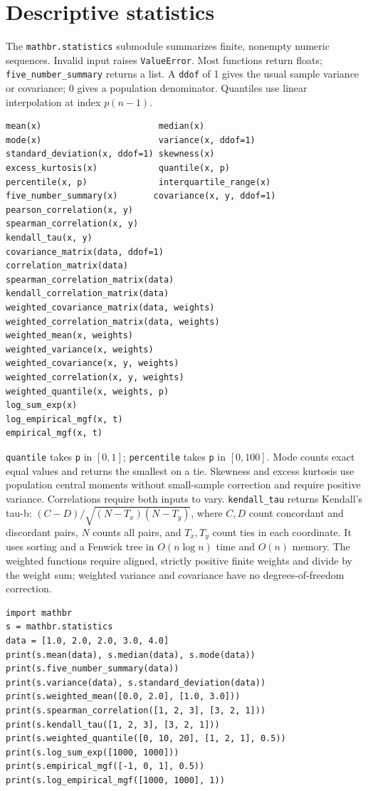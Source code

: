 \documentclass[11pt,a4paper]{article}
\begin{document}
\section{Descriptive statistics}
The \verb|mathbr.statistics| submodule summarizes finite, nonempty numeric sequences. Invalid input raises \verb|ValueError|. Most functions return floats; \verb|five_number_summary| returns a list. A \verb|ddof| of 1 gives the usual sample variance or covariance; 0 gives a population denominator. Quantiles use linear interpolation at index $p(n-1)$.
\begin{verbatim}
mean(x)                       median(x)
mode(x)                       variance(x, ddof=1)
standard_deviation(x, ddof=1) skewness(x)
excess_kurtosis(x)            quantile(x, p)
percentile(x, p)              interquartile_range(x)
five_number_summary(x)       covariance(x, y, ddof=1)
pearson_correlation(x, y)
spearman_correlation(x, y)
kendall_tau(x, y)
covariance_matrix(data, ddof=1)
correlation_matrix(data)
spearman_correlation_matrix(data)
kendall_correlation_matrix(data)
weighted_covariance_matrix(data, weights)
weighted_correlation_matrix(data, weights)
weighted_mean(x, weights)
weighted_variance(x, weights)
weighted_covariance(x, y, weights)
weighted_correlation(x, y, weights)
weighted_quantile(x, weights, p)
log_sum_exp(x)
log_empirical_mgf(x, t)
empirical_mgf(x, t)
\end{verbatim}
\verb|quantile| takes \verb|p| in $[0,1]$; \verb|percentile| takes \verb|p| in $[0,100]$. Mode counts exact equal values and returns the smallest on a tie. Skewness and excess kurtosis use population central moments without small-sample correction and require positive variance. Correlations require both inputs to vary. \verb|kendall_tau| returns Kendall's tau-b: $(C-D)/\sqrt{(N-T_x)(N-T_y)}$, where $C,D$ count concordant and discordant pairs, $N$ counts all pairs, and $T_x,T_y$ count ties in each coordinate. It uses sorting and a Fenwick tree in $O(n\log n)$ time and $O(n)$ memory. The weighted functions require aligned, strictly positive finite weights and divide by the weight sum; weighted variance and covariance have no degrees-of-freedom correction.
\begin{verbatim}
import mathbr
s = mathbr.statistics
data = [1.0, 2.0, 2.0, 3.0, 4.0]
print(s.mean(data), s.median(data), s.mode(data))
print(s.five_number_summary(data))
print(s.variance(data), s.standard_deviation(data))
print(s.weighted_mean([0.0, 2.0], [1.0, 3.0]))
print(s.spearman_correlation([1, 2, 3], [3, 2, 1]))
print(s.kendall_tau([1, 2, 3], [3, 2, 1]))
print(s.weighted_quantile([0, 10, 20], [1, 2, 1], 0.5))
print(s.log_sum_exp([1000, 1000]))
print(s.empirical_mgf([-1, 0, 1], 0.5))
print(s.log_empirical_mgf([1000, 1000], 1))
\end{verbatim}
\end{document}
